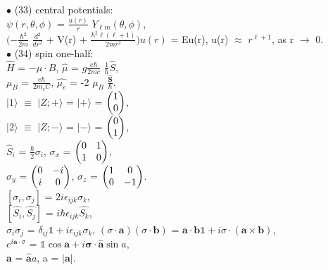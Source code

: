 \documentclass[10pt,fancy]{elegantbook}
\begin{document}
{$\bullet$ (33) central potentials:  \\ 
$\psi(r, \theta, \phi)$ = $\frac{u(r)}{r}$ $Y_{\ell m}(\theta, \phi)$,  \\  
$ (- {\frac{\hbar^2}{2m}}$ $ \frac{d^2}{dr^2}$ + V(r) + $\frac{\hbar^2 \ell (\ell + 1)} {2mr^2}) u(r) $ = Eu(r), u(r) $\approx$ $r^{\ell + 1}$, as r $\longrightarrow$ 0.  \\

$\bullet$ (34) spin one-half:  \\ 
$\hat{H}$ = $- \mu \cdot B$, $\hat{\mu}$ = $ g \frac{e \hbar}{2mc}$ $\frac{1}{\hbar} \hat{S}$,  \\  
$\mu_B$ = $\frac{e \hbar}{2m_eC}$, $ \hat{\mu_e}$ = -2 $ \mu_B$ $\frac{\hat{\mathbf S}}{\hbar}$.  \\                            
$\mid 1 \rangle$ $\equiv$ $\mid Z; + \rangle$ = $\mid + \rangle$ = $\begin{pmatrix}1\cr0\cr\end{pmatrix}$,  \\ 
$\mid 2 \rangle$ $\equiv$ $\mid Z; - \rangle$ = $\mid - \rangle$ = $\begin{pmatrix}0\cr1\cr\end{pmatrix}$, \\ 
$\hat{S}_i$ = $\frac{\hbar}{2} \sigma_i$, $\sigma_x$ = $\begin{pmatrix}0 & 1\cr 1 & 0\cr\end{pmatrix}$, \\
$\sigma_y$ = $\begin{pmatrix}0 & -i\cr i & 0\cr\end{pmatrix}$, $\sigma_z$ = $\begin{pmatrix}1 & 0\cr 0 & -1\cr\end{pmatrix}$.  \\      
$[\sigma_i, \sigma_j]$ = $2i \epsilon_{ijk} \sigma_k$,  \\ 
$[\hat{S_i}, \hat{S_j}]$ = $i \hbar \epsilon_{ijk} \hat{S_k}$,  \\  
$\sigma_i \sigma_j$ = $\delta_{ij} \mathbb1 + i \epsilon_{ijk} \sigma_k$, $(\sigma \cdot \mathbf a) (\sigma \cdot \mathbf b)$ = $\mathbf a \cdot \mathbf b \mathbb 1 + i \sigma \cdot (\mathbf a \times \mathbf b)$, \\ 
$e^{i \mathbf a \cdot \sigma}$ = $\mathbb1 \cos \mathbf a + i {\mathbf \sigma}  \cdot  \hat{\mathbf a} \sin a$,  \\ 
$ \mathbf a$ = $\hat{\mathbf a} a$, a = $|\mathbf a|$.  \\  
}
\end{document}
